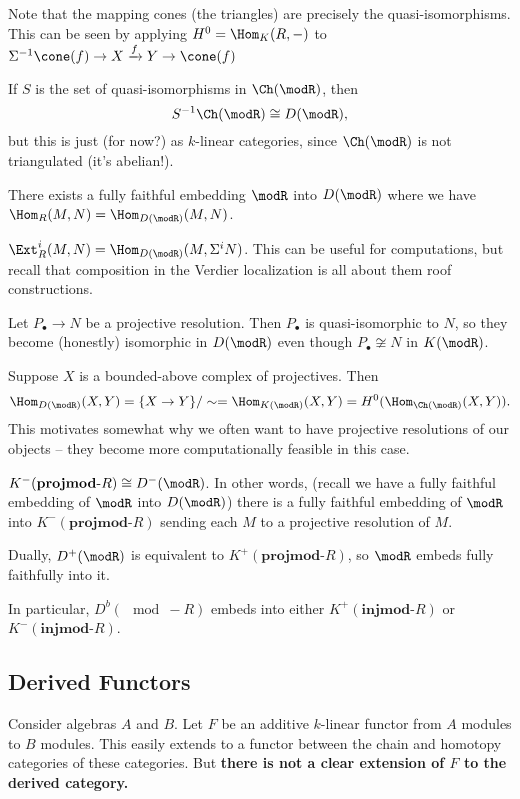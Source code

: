 \documentclass[12pt]{article}
\begin{document}
Note that the mapping cones (the triangles) are precisely the quasi-isomorphisms. This can be seen by applying $H^0=\Hom_K(R,-)$
to $\Sigma^{-1}\cone(f)\to X\xrightarrow{f} Y\to \cone(f)$
\begin{rmk}
	If $S$ is the set of quasi-isomorphisms in $\Ch(\modR)$, then 
	\[S^{-1}\Ch(\modR)\cong D(\modR),\] 
	but this is just (for now?) as $k$-linear categories, since $\Ch(\modR)$ is not triangulated (it's abelian!).
\end{rmk}
\begin{rmk}
	There exists a fully faithful embedding $\modR$ into $D(\modR)$ where we have $\Hom_R(M,N)=\Hom_{D(\modR)}(M,N)$.
\end{rmk}
\begin{rmk}
	$\Ext_R^i(M,N)=\Hom_{D(\modR)}(M,\Sigma^iN)$. This can be useful for computations, but recall that composition in the Verdier localization is 
	all about them roof constructions.
\end{rmk}
\begin{rmk}
	Let $P_\bullet\to N$ be a projective resolution. Then $P_\bullet$ is quasi-isomorphic to $N$, so they become (honestly) isomorphic in $D(\modR)$
	even though $P_\bullet\not\cong N$ in $K(\modR)$.
\end{rmk}
\begin{rmk}
	Suppose $X$ is a bounded-above complex of projectives. Then 
	\[\Hom_{D(\modR)}(X,Y)=\{X\to Y\}/\sim = \Hom_{K(\modR)}(X,Y)=H^0(\Hom_{\Ch(\modR)}(X,Y)).\]
	This motivates somewhat why we often want to have projective resolutions of our objects -- they become more computationally feasible 
	in this case.
\end{rmk}
\begin{rmk}
	$K^{-}(\mathbf{projmod}\text{-}R)\cong D^-(\modR)$. In other words, (recall we have a fully faithful embedding of $\modR$ into $D(\modR)$)
	there is a fully faithful embedding of $\modR$ into $K^-(\mathbf{projmod}\text{-}R)$ sending each $M$ to 
	a projective resolution of $M$.

	Dually, $D^+(\modR)$ is equivalent to $K^+(\mathbf{projmod}\text{-}R)$, so $\modR$ embeds fully faithfully into it.
\end{rmk}
\begin{rmk}
	In particular, $D^b(\mod-R)$ embeds into either $K^+(\mathbf{injmod}\text{-}R)$ or $K^-(\mathbf{injmod}\text{-}R)$.
\end{rmk}

\subsection{Derived Functors}
Consider algebras $A$ and $B$. Let $F$ be an additive $k$-linear functor from $A$ modules to $B$ modules. This easily extends 
to a functor between the chain and homotopy categories of these categories. But \textbf{there is not a clear extension of $F$ to the derived category.}
\end{document}
